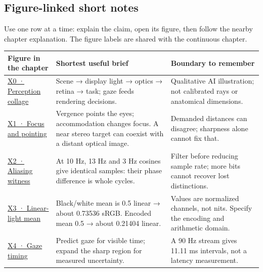 \subsection{Figure-linked short notes}\label{appendix-73c6b8ed5a87-figure-linked-short-notes}

Use one row at a time: explain the claim, open its figure, then follow the nearby chapter explanation. The figure labels are shared with the continuous chapter.

{\def\LTcaptype{none} %
\begin{longtable}[]{@{}
  >{\raggedright\arraybackslash}p{}
  >{\raggedright\arraybackslash}p{}
  >{\raggedright\arraybackslash}p{}@{}}
\toprule\noalign{}
\begin{minipage}[b]{\linewidth}\raggedright
Figure in the chapter
\end{minipage} & \begin{minipage}[b]{\linewidth}\raggedright
Shortest useful brief
\end{minipage} & \begin{minipage}[b]{\linewidth}\raggedright
Boundary to remember
\end{minipage} \\
\midrule\noalign{}
\endhead
\bottomrule\noalign{}
\endlastfoot
\hyperref[04-visual-computing-ii-ch042-figure-x0-a-qualitative-picture-of-the-xr-loop]{X0 · Perception collage} & Scene → display light → optics → retina → task; gaze feeds rendering decisions. & Qualitative AI illustration; not calibrated rays or anatomical dimensions. \\
\hyperref[04-visual-computing-ii-ch042-figure-x1-two-simultaneous-depth-demands]{X1 · Focus and pointing} & Vergence points the eyes; accommodation changes focus. A near stereo target can coexist with a distant optical image. & Demanded distances can disagree; sharpness alone cannot fix that. \\
\hyperref[04-visual-computing-ii-ch042-figure-x2-the-samples-cannot-name-their-original]{X2 · Aliasing witness} & At 10 Hz, 13 Hz and 3 Hz cosines give identical samples: their phase difference is whole cycles. & Filter before reducing sample rate; more bits cannot recover lost distinctions. \\
\hyperref[04-visual-computing-ii-ch042-figure-x3-same-endpoints-different-averaging-domain]{X3 · Linear-light mean} & Black/white mean is 0.5 linear → about 0.73536 sRGB. Encoded mean 0.5 → about 0.21404 linear. & Values are normalized channels, not nits. Specify the encoding and arithmetic domain. \\
\hyperref[04-visual-computing-ii-ch042-figure-x4-aim-detail-at-visible-time]{X4 · Gaze timing} & Predict gaze for visible time; expand the sharp region for measured uncertainty. & A 90 Hz stream gives 11.11 ms intervals, not a latency measurement. \\
\end{longtable}
}

